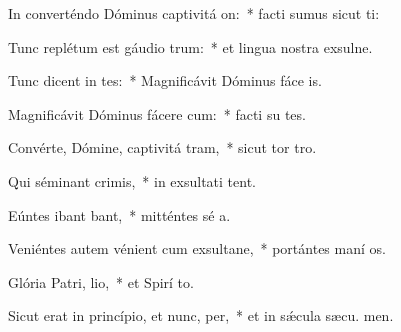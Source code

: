 \item In converténdo Dóminus captivitá on:~* facti sumus sicut ti:
\item Tunc replétum est gáudio  trum:~* et lingua nostra exsulne.
\item Tunc dicent in tes:~* Magnificávit Dóminus fáce  is.
\item Magnificávit Dóminus fácere cum:~* facti su tes.
\item Convérte, Dómine, captivitá tram,~* sicut tor  tro.
\item Qui séminant  crimis,~* in exsultati tent.
\item Eúntes ibant  bant,~* mitténtes sé a.
\item Veniéntes autem vénient cum exsultane,~* portántes maní os.
\item Glória Patri,  lio,~* et Spirí to.
\item Sicut erat in princípio, et nunc,  per,~* et in sǽcula sæcu. men.
